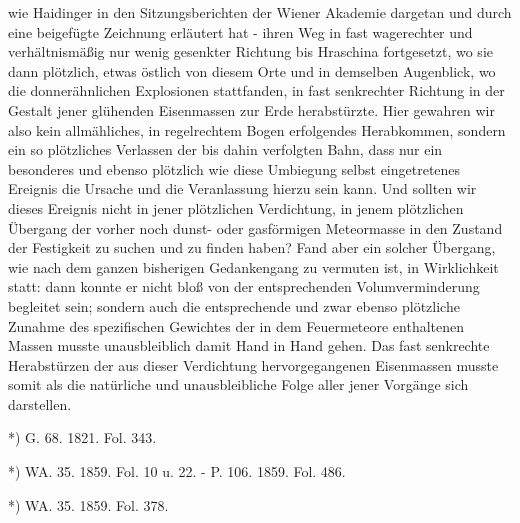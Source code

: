 \documentclass[a4paper, 11pt, oneside, polutonikogreek, german]{article}
\begin{document}
wie Haidinger in den Sitzungsberichten der Wiener Akademie dargetan und durch eine beigefügte Zeichnung erläutert hat - ihren Weg in fast wagerechter und verhältnismäßig nur wenig gesenkter Richtung bis Hraschina fortgesetzt, wo sie dann plötzlich, etwas östlich von diesem Orte und in demselben Augenblick, wo die donnerähnlichen Explosionen stattfanden, in fast senkrechter Richtung in der Gestalt jener glühenden Eisenmassen zur Erde herabstürzte. Hier gewahren wir also kein allmähliches, in regelrechtem Bogen erfolgendes Herabkommen, sondern ein so plötzliches Verlassen der bis dahin verfolgten Bahn, dass nur ein besonderes und ebenso plötzlich wie diese Umbiegung selbst eingetretenes Ereignis die Ursache und die Veranlassung hierzu sein kann. Und sollten wir dieses Ereignis nicht in jener plötzlichen Verdichtung, in jenem plötzlichen Übergang der vorher noch dunst- oder gasförmigen Meteormasse in den Zustand der Festigkeit zu suchen und zu finden haben? Fand aber ein solcher Übergang, wie nach dem ganzen bisherigen Gedankengang zu vermuten ist, in Wirklichkeit statt: dann konnte er nicht bloß von der entsprechenden Volumverminderung begleitet sein; sondern auch die entsprechende und zwar ebenso plötzliche Zunahme des spezifischen Gewichtes der in dem Feuermeteore enthaltenen Massen musste unausbleiblich damit Hand in Hand gehen. Das fast senkrechte Herabstürzen der aus dieser Verdichtung hervorgegangenen Eisenmassen musste somit als die natürliche und unausbleibliche Folge aller jener Vorgänge sich darstellen.

*) G. 68. 1821. Fol. 343.

*) WA. 35. 1859. Fol. 10 u. 22. - P. 106. 1859. Fol. 486.

*) WA. 35. 1859. Fol. 378.
\end{document}
